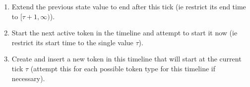 \begin{enumerate}

\item Extend the previous state value to end after this tick (ie
  restrict its end time to $[\tau+1, \infty)$). 

\item Start the next active token in the timeline and
  attempt to start it now (ie restrict its start time to the single
  value $\tau$).

\item Create and insert a new token in this timeline that will start
  at the current tick $\tau$ (attempt this for each possible token
  type for this timeline if necessary). 

\end{enumerate}

